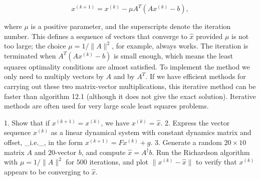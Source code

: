 \[x^{(k+1)}=x^{(k)}-\mu A^{T}(Ax^{(k)}-b),\]

where \(\mu\) is a positive parameter, and the superscripts denote the iteration number. This defines a sequence of vectors that converge to \(\hat{x}\) provided \(\mu\) is not too large; the choice \(\mu=1/\|A\|^{2}\), for example, always works. The iteration is terminated when \(A^{T}(Ax^{(k)}-b)\) is small enough, which means the least squares optimality conditions are almost satisfied. To implement the method we only need to multiply vectors by \(A\) and by \(A^{T}\). If we have efficient methods for carrying out these two matrix-vector multiplications, this iterative method can be faster than algorithm 12.1 (although it does not give the exact solution). Iterative methods are often used for very large scale least squares problems.

1. Show that if \(x^{(k+1)}=x^{(k)}\), we have \(x^{(k)}=\hat{x}\).
2. Express the vector sequence \(x^{(k)}\) as a linear dynamical system with constant dynamics matrix and offset, _i.e._, in the form \(x^{(k+1)}=Fx^{(k)}+g\).
3. Generate a random \(20\times 10\) matrix \(A\) and \(20\)-vector \(b\), and compute \(\hat{x}=A^{\dagger}b\). Run the Richardson algorithm with \(\mu=1/\|A\|^{2}\) for \(500\) iterations, and plot \(\|x^{(k)}-\hat{x}\|\) to verify that \(x^{(k)}\) appears to be converging to \(\hat{x}\).

